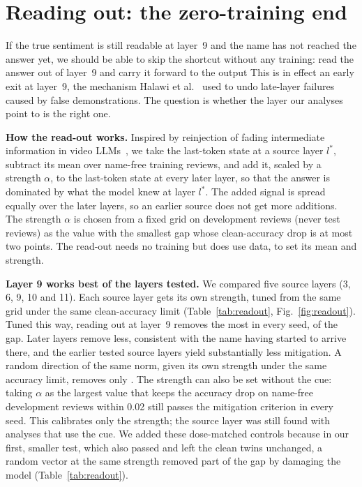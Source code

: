 \section{Reading out: the zero-training end}
\label{sec:readout}

If the true sentiment is still readable at layer~9 and the name has not reached the answer yet, we should be able to
skip the shortcut without any training: read the answer out of layer~9 and carry it forward to the output
This is in effect an early exit at layer~9, the mechanism Halawi et al.~\cite{halawi2024overthinking} used to undo
late-layer failures caused by false demonstrations. The question is whether the layer our analyses point to is the
right one.

\textbf{How the read-out works.} Inspired by reinjection of fading intermediate information in video
LLMs~\cite{shin2026fades}, we take the last-token state at a source layer $l^*$, subtract its mean over name-free
training reviews, and add it, scaled by a strength $\alpha$, to the last-token state at every later layer, so that the
answer is dominated by what the model knew at layer $l^*$. The added signal is spread equally over the later layers,
so an earlier source does not get more additions. The strength $\alpha$ is chosen from a fixed grid on development
reviews (never test reviews) as the value with the smallest gap whose clean-accuracy drop is at most two points. The
read-out needs no training but does use data, to set its mean and strength.

\textbf{Layer 9 works best of the layers tested.} We compared five source layers (3, 6, 9, 10 and 11). Each source
layer gets its own strength, tuned from the same grid under the same clean-accuracy limit (Table~\ref{tab:readout},
Fig.~\ref{fig:readout}). Tuned this way, reading out at layer~9 removes the most in every seed,
\pSixBEqLNineRemovedFullFTRange{} of the gap. Later layers remove less, consistent with the
name having started to arrive there, and the earlier tested source layers yield substantially less mitigation. A
random direction of the same norm, given its own strength under the same accuracy limit, removes only
\pSixBRandomRemovedFullFTRange. The strength can also be set without the cue: taking
$\alpha$ as the largest value that keeps the accuracy drop on name-free development reviews within 0.02 still passes the
mitigation criterion in every seed. This calibrates only the strength; the source layer was still found with analyses
that use the cue. We added these dose-matched controls because in our first, smaller test, which also passed and left
the clean twins unchanged, a random vector at the same strength removed part of the gap by damaging the model
(Table~\ref{tab:readout}).


